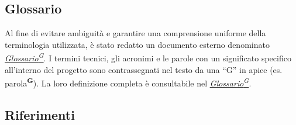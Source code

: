 \documentclass[a4paper,12pt]{article}
\providecommand{\glslink}[2]{\href{https://alittlebyte-19.github.io/Documentazione/glossario.html\#gls-#1}{\underline{#2}\textsuperscript{\scriptsize G}}}
\begin{document}
\subsection{Glossario}
Al fine di evitare ambiguità e garantire una comprensione uniforme della terminologia utilizzata, è stato redatto un documento esterno denominato \textit{\glslink{glossario}{Glossario}}.
I termini tecnici, gli acronimi e le parole con un significato specifico all'interno del progetto sono contrassegnati nel testo da una ``G'' in apice (es. parola\textsuperscript{\scriptsize\textbf{G}}). La loro definizione completa è consultabile nel \textit{\glslink{glossario}{Glossario}}.

\subsection{Riferimenti}
\end{document}
